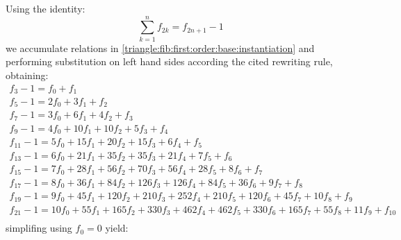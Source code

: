 \documentclass[a4paper,dottedtoc,headinclude,footinclude]{report} %
\theoremstyle{plain}
\begin{document}
    Using the identity:
    \begin{displaymath}
        \sum_{k=1}^{n} f_{2 k} = f_{2 n + 1} - 1
    \end{displaymath}
    we accumulate relations in \autoref{triangle:fib:first:order:base:instantiation} 
    and performing substitution on left hand sides according the cited 
    rewriting rule, obtaining:
    \begin{displaymath}
        \begin{array}{c}
            f_{3} - 1 = f_{0} + f_{1}\\
            f_{5} - 1 = 2 f_{0} + 3 f_{1} + f_{2}\\
            f_{7} - 1 = 3 f_{0} + 6 f_{1} + 4 f_{2} + f_{3}\\
            f_{9} - 1 = 4 f_{0} + 10 f_{1} + 10 f_{2} + 5 f_{3} + f_{4}\\
            f_{11} - 1 = 5 f_{0} + 15 f_{1} + 20 f_{2} + 15 f_{3} + 6 f_{4} + f_{5}\\
            f_{13} - 1 = 6 f_{0} + 21 f_{1} + 35 f_{2} + 35 f_{3} + 21 f_{4} + 7 f_{5} + f_{6}\\
            f_{15} - 1 = 7 f_{0} + 28 f_{1} + 56 f_{2} + 70 f_{3} + 56 f_{4} + 28 f_{5} + 8 f_{6} + f_{7}\\
            f_{17} - 1 = 8 f_{0} + 36 f_{1} + 84 f_{2} + 126 f_{3} + 126 f_{4} + 84 f_{5} + 36 f_{6} + 9 f_{7} + f_{8}\\
            f_{19} - 1 = 9 f_{0} + 45 f_{1} + 120 f_{2} + 210 f_{3} + 252 f_{4} + 210 f_{5} + 120 f_{6} + 45 f_{7} + 10 f_{8} + f_{9}\\
            f_{21} - 1 = 10 f_{0} + 55 f_{1} + 165 f_{2} + 330 f_{3} + 462 f_{4} + 462 f_{5} + 330 f_{6} + 165 f_{7} + 55 f_{8} + 11 f_{9} + f_{10}\\
        \end{array}
    \end{displaymath}
    simplifing using $f_{0}=0$ yield:
\end{document}

